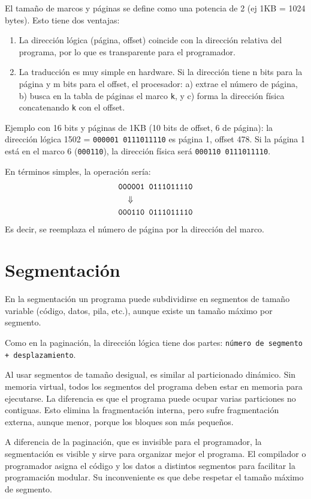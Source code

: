 El tamaño de marcos y páginas se define como una potencia de 2 (ej 1KB = 1024 bytes). Esto tiene dos ventajas:
\begin{enumerate}
  \item La dirección lógica (página, offset) coincide con la dirección relativa del programa, por lo que es transparente para el programador.
  \item La traducción es muy simple en hardware. Si la dirección tiene n bits para la página y m bits para el offset, el procesador: a) extrae el número de página, b) busca en la tabla de páginas el marco \texttt{k}, y c) forma la dirección física concatenando \texttt{k} con el offset.
\end{enumerate}

Ejemplo con 16 bits y páginas de 1KB (10 bits de offset, 6 de página): la dirección lógica 1502 = \texttt{000001 0111011110} es página 1, offset 478. Si la página 1 está en el marco 6 (\texttt{000110}), la dirección física será \texttt{000110 0111011110}.

En términos simples, la operación sería:
\begin{gather*}
  \text{\texttt{000001 0111011110}} \\ \Downarrow \qquad\qquad\qquad \\ \text{\texttt{000110 0111011110}}
\end{gather*}
Es decir, se reemplaza el número de página por la dirección del marco.

\section{Segmentación}

En la segmentación un programa puede subdividirse en segmentos de tamaño variable (código, datos, pila, etc.), aunque existe un tamaño máximo por segmento. 

Como en la paginación, la dirección lógica tiene dos partes: \texttt{número de segmento + desplazamiento}.

Al usar segmentos de tamaño desigual, es similar al particionado dinámico. Sin memoria virtual, todos los segmentos del programa deben estar en memoria para ejecutarse. La diferencia es que el programa puede ocupar varias particiones no contiguas. Esto elimina la fragmentación interna, pero sufre fragmentación externa, aunque menor, porque los bloques son más pequeños.

A diferencia de la paginación, que es invisible para el programador, la segmentación es visible y sirve para organizar mejor el programa. El compilador o programador asigna el código y los datos a distintos segmentos para facilitar la programación modular. Su inconveniente es que debe respetar el tamaño máximo de segmento.

